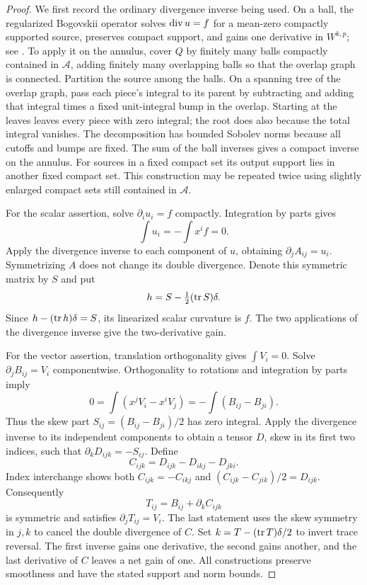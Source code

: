 \begin{proof}
We first record the ordinary divergence inverse being used.  On a ball,
the regularized Bogovskii operator solves $\operatorname{div} u=f$ for a mean-zero
compactly supported source, preserves compact support, and gains one
derivative in $W^{k,p}$; see
\cite[\S3.1, Equation~(3.13), Theorem~3.2, Corollary~3.4, and Remark~3.5]{CostabelMcIntosh2010}.
To apply it on the annulus, cover $Q$ by finitely
many balls compactly contained in $\mathcal A$, adding finitely many
overlapping balls so that the overlap graph is connected.  Partition the
source among the balls.  On a spanning tree of the overlap graph, pass
each piece's integral to its parent by subtracting and adding that
integral times a fixed unit-integral bump in the overlap.  Starting at
the leaves leaves every piece with zero integral; the root does also
because the total integral vanishes.  The decomposition has bounded
Sobolev norms because all cutoffs and bumps are fixed.  The sum of the
ball inverses gives a compact inverse on the annulus.  For sources in a
fixed compact set its output support lies in another fixed compact set.
This construction may be repeated twice using slightly enlarged compact
sets still contained in $\mathcal A$.

For the scalar assertion, solve $\partial_i u_i=f$ compactly.
Integration by parts gives
\[
 \int u_i=-\int x^if=0.
\]
Apply the divergence inverse to each component of $u$, obtaining
$\partial_j A_{ij}=u_i$.  Symmetrizing $A$ does not change its double
divergence.  Denote this symmetric matrix by $S$ and put
\[
 h=S-\tfrac12(\operatorname{tr} S)\delta.
\]
Since $h-(\operatorname{tr} h)\delta=S$, its linearized scalar curvature is $f$.
The two applications of the divergence inverse give the two-derivative
gain.

For the vector assertion, translation orthogonality gives
$\int V_i=0$.  Solve $\partial_jB_{ij}=V_i$ componentwise.  Orthogonality
to rotations and integration by parts imply
\[
 0=\int(x^jV_i-x^iV_j)
   =-\int(B_{ij}-B_{ji}).
\]
Thus the skew part $S_{ij}=(B_{ij}-B_{ji})/2$ has zero integral.  Apply
the divergence inverse to its independent components to obtain a tensor
$D$, skew in its first two indices, such that
$\partial_kD_{ijk}=-S_{ij}$.  Define
\begin{equation}
 \label{n3:reduction:stress-symmetrization}
 C_{ijk}=D_{ijk}-D_{ikj}-D_{jki}.
\end{equation}
Index interchange shows both
$C_{ijk}=-C_{ikj}$ and
$(C_{ijk}-C_{jik})/2=D_{ijk}$.  Consequently
\[
 T_{ij}=B_{ij}+\partial_kC_{ijk}
\]
is symmetric and satisfies $\partial_jT_{ij}=V_i$.  The last statement
uses the skew symmetry in $j,k$ to cancel the double divergence of $C$.
Set $k=T-(\operatorname{tr} T)\delta/2$ to invert trace reversal.  The first inverse
gains one derivative, the second gains another, and the last derivative
of $C$ leaves a net gain of one.  All constructions preserve smoothness
and have the stated support and norm bounds.
\end{proof}


